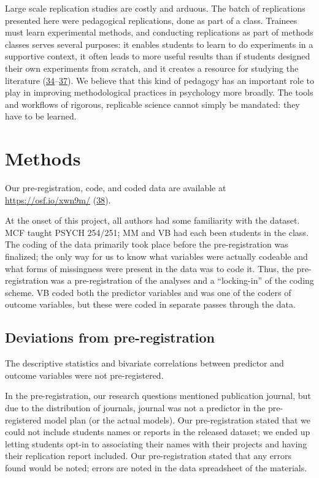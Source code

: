\documentclass[
  english,
  a4paper,
]{article}
\begin{document}
Large scale replication studies are costly and arduous. The batch of replications presented here were pedagogical replications, done as part of a class. Trainees must learn experimental methods, and conducting replications as part of methods classes serves several purposes: it enables students to learn to do experiments in a supportive context, it often leads to more useful results than if students designed their own experiments from scratch, and it creates a resource for studying the literature (\protect\hyperlink{ref-quintana2021}{34}--\protect\hyperlink{ref-hawkins2018}{37}). We believe that this kind of pedagogy has an important role to play in improving methodological practices in psychology more broadly. The tools and workflows of rigorous, replicable science cannot simply be mandated: they have to be learned.

\hypertarget{methods}{%
\section{Methods}\label{methods}}

Our pre-registration, code, and coded data are available at \url{https://osf.io/xwn9m/} (\protect\hyperlink{ref-osfdata}{38}).

At the onset of this project, all authors had some familiarity with the dataset. MCF taught PSYCH 254/251; MM and VB had each been students in the class. The coding of the data primarily took place before the pre-registration was finalized; the only way for us to know what variables were actually codeable and what forms of missingness were present in the data was to code it. Thus, the pre-registration was a pre-registration of the analyses and a ``locking-in'' of the coding scheme. VB coded both the predictor variables and was one of the coders of outcome variables, but these were coded in separate passes through the data.

\hypertarget{deviations-from-pre-registration}{%
\subsection{Deviations from pre-registration}\label{deviations-from-pre-registration}}

The descriptive statistics and bivariate correlations between predictor and outcome variables were not pre-registered.

In the pre-registration, our research questions mentioned publication journal, but due to the distribution of journals, journal was not a predictor in the pre-registered model plan (or the actual models). Our pre-registration stated that we could not include students names or reports in the released dataset; we ended up letting students opt-in to associating their names with their projects and having their replication report included. Our pre-registration stated that any errors found would be noted; errors are noted in the data spreadsheet of the materials.
\end{document}
